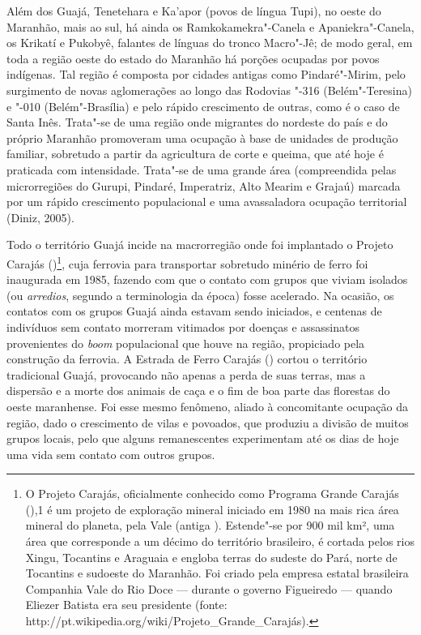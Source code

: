 Além dos Guajá, Tenetehara e Ka'apor (povos de língua Tupi), no oeste do
Maranhão, mais ao sul, há ainda os Ramkokamekra"-Canela e
Apaniekra"-Canela, os Krikatí e Pukobyê, falantes de línguas do tronco
Macro"-Jê; de modo geral, em toda a região oeste do estado do Maranhão há
porções ocupadas por povos indígenas. Tal região é composta por cidades
antigas como Pindaré"-Mirim, pelo surgimento de novas aglomerações ao
longo das Rodovias "-316 (Belém"-Teresina) e "-010 (Belém"-Brasília) e
pelo rápido crescimento de outras, como é o caso de Santa Inês. Trata"-se
de uma região onde migrantes do nordeste do país e do próprio Maranhão
promoveram uma ocupação à base de unidades de produção familiar,
sobretudo a partir da agricultura de corte e queima, que até hoje é
praticada com intensidade. Trata"-se de uma grande área (compreendida
pelas microrregiões do Gurupi, Pindaré, Imperatriz, Alto Mearim e
Grajaú) marcada por um rápido crescimento populacional e uma
avassaladora ocupação territorial (Diniz, 2005).

Todo o território Guajá incide na macrorregião onde foi implantado o
Projeto Carajás ()\footnote{O Projeto Carajás, oficialmente conhecido
  como Programa Grande Carajás (),1 é um projeto de exploração mineral
  iniciado em 1980 na mais rica área mineral do planeta, pela Vale
  (antiga ). Estende"-se por 900 mil km², uma área que corresponde a
  um décimo do território brasileiro, é cortada pelos rios Xingu,
  Tocantins e Araguaia e engloba terras do sudeste do Pará, norte de
  Tocantins e sudoeste do Maranhão. Foi criado pela empresa estatal
  brasileira Companhia Vale do Rio Doce --- durante o governo Figueiredo ---
  quando Eliezer Batista era seu presidente (fonte:
  http://pt.wikipedia.org/wiki/Projeto\_Grande\_Carajás).}, cuja
ferrovia para transportar sobretudo minério de ferro foi inaugurada em
1985, fazendo com que o contato com grupos que viviam isolados (ou
\emph{arredios}, segundo a terminologia da época) fosse acelerado. Na
ocasião, os contatos com os grupos Guajá ainda estavam sendo iniciados,
e centenas de indivíduos sem contato morreram vitimados por doenças e
assassinatos provenientes do \emph{boom} populacional que houve na
região, propiciado pela construção da ferrovia. A Estrada de Ferro
Carajás () cortou o território tradicional Guajá, provocando não
apenas a perda de suas terras, mas a dispersão e a morte dos animais de
caça e o fim de boa parte das florestas do oeste maranhense. Foi esse
mesmo fenômeno, aliado à concomitante ocupação da região, dado o
crescimento de vilas e povoados, que produziu a divisão de muitos grupos
locais, pelo que alguns remanescentes experimentam até os dias de hoje
uma vida sem contato com outros grupos.

